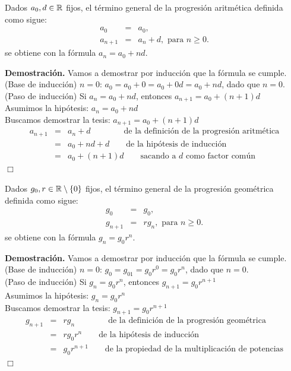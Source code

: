\begin{prop}
Dados $a_0, d\in\mathbb{R}$ fijos, el término general de la progresión aritmética definida como sigue:
\begin{eqnarray*}
a_0&=&a_0,\\
a_{n+1}&=&a_n+d,\textrm{ para }n\ge0.
\end{eqnarray*}
se obtiene con la fórmula $a_n=a_0+nd$.
\end{prop}
{\bf Demostración.}
Vamos a demostrar por inducción que la fórmula se cumple.
(Base de inducción) $n=0$: $a_0=a_0+0=a_0+0d=a_0+nd$, dado que $n=0$.\\
(Paso de inducción) Si $a_n=a_0+nd$, entonces $a_{n+1}=a_0+(n+1)d$\\
Asumimos la hipótesis: $a_n=a_0+nd$\\
Buscamos demostrar la tesis: $a_{n+1}=a_0+(n+1)d$\\
\begin{eqnarray*}
  a_{n+1}&=&a_n+d \qquad \qquad \textrm{de la definición de la progresión aritmética}\\
  &=& a_0+nd+d  \qquad \textrm{de la hipótesis de inducción}\\
  &=& a_0+(n+1)d \qquad \textrm{sacando a $d$ como factor común }
\end{eqnarray*}
\hfill $\Box$


\begin{prop}
Dados $g_0, r\in\mathbb{R}\setminus\{0\}$ fijos, el término general de la progresión geométrica definida como sigue:
\begin{eqnarray*}
g_0&=&g_0,\\
g_{n+1}&=&rg_n,\textrm{ para }n\ge0.
\end{eqnarray*}
se obtiene con la fórmula $g_n=g_0r^n$.
\end{prop}
{\bf Demostración.}
Vamos a demostrar por inducción que la fórmula se cumple.
(Base de inducción) $n=0$: $g_0=g_01=g_0r^0=g_0r^n$, dado que $n=0$.\\
(Paso de inducción) Si $g_n=g_0r^n$, entonces $g_{n+1}=g_0r^{n+1}$\\
Asumimos la hipótesis: $g_n=g_0r^n$\\
Buscamos demostrar la tesis: $g_{n+1}=g_0r^{n+1}$\\
\begin{eqnarray*}
  g_{n+1}&=&rg_n \qquad \qquad \textrm{de la definición de la progresión geométrica}\\
  &=& r g_0r^n  \qquad \textrm{de la hipótesis de inducción}\\
  &=& g_0r^{n+1} \qquad \textrm{de la propiedad de la multiplicación de potencias}
\end{eqnarray*}
\hfill $\Box$

